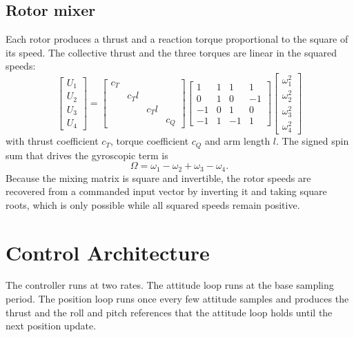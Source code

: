 \documentclass[11pt,a4paper]{article}
\numberwithin{equation}{section}
\begin{document}
\subsection{Rotor mixer}

Each rotor produces a thrust and a reaction torque proportional to the square of its speed. The collective thrust and the three torques are linear in the squared speeds:
\begin{equation}
\boxed{
\begin{bmatrix}U_1\\U_2\\U_3\\U_4\end{bmatrix}=
\begin{bmatrix}c_T&&&\\&c_T l&&\\&&c_T l&\\&&&c_Q\end{bmatrix}
\begin{bmatrix}
1&1&1&1\\
0&1&0&-1\\
-1&0&1&0\\
-1&1&-1&1
\end{bmatrix}
\begin{bmatrix}\omega_1^2\\\omega_2^2\\\omega_3^2\\\omega_4^2\end{bmatrix}}
\end{equation}
with thrust coefficient $c_T$, torque coefficient $c_Q$ and arm length $l$. The signed spin sum that drives the gyroscopic term is
\begin{equation}
\Omega=\omega_1-\omega_2+\omega_3-\omega_4 .
\end{equation}
Because the mixing matrix is square and invertible, the rotor speeds are recovered from a commanded input vector by inverting it and taking square roots, which is only possible while all squared speeds remain positive.

\section{Control Architecture}\label{sec:control}

The controller runs at two rates. The attitude loop runs at the base sampling period. The position loop runs once every few attitude samples and produces the thrust and the roll and pitch references that the attitude loop holds until the next position update.
\end{document}
